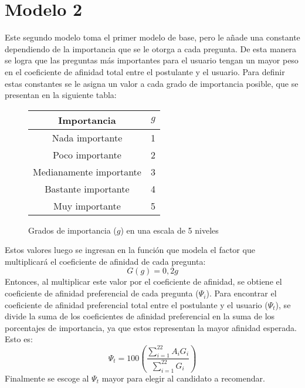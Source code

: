 \documentclass[a4paper]{article}
\begin{document}
\section{Modelo 2}
Este segundo modelo toma el primer modelo de base, pero le añade una constante dependiendo de la importancia que se le otorga a cada pregunta. De esta manera se logra que las preguntas más importantes para el usuario tengan un mayor peso en el coeficiente de afinidad total entre el postulante y el usuario. Para definir estas constantes se le asigna un valor a cada grado de importancia posible, que se presentan en la siguiente tabla: \newline 

\begin{figure}[H]
    \begin{center}
    \begin{tabular}{|c|c|}
    \hline
    Importancia &  $g$\\
    \hline
    Nada importante &  1\\
    \hline
    Poco importante & 2\\
    \hline
    Medianamente importante & 3\\
    \hline
    Bastante importante & 4\\
    \hline
    Muy importante & 5 \\
    \hline
\end{tabular}
\end{center}   
    \caption{ Grados de importancia ($g$) en una escala de 5 niveles}
\end{figure} 

\newline
Estos valores luego se ingresan en la función que modela el factor que multiplicará el coeficiente de afinidad de cada pregunta:
\begin{equation*}
    G(g) = 0,2g
\end{equation*}
Entonces, al multiplicar este valor por el coeficiente de afinidad, se obtiene el coeficiente de afinidad preferencial de cada pregunta ($\Psi_{i}$). Para encontrar el coeficiente de afinidad preferencial total entre el postulante y el usuario ($\Psi_{t}$), se divide la suma de los coeficientes de afinidad preferencial en la suma de los porcentajes de importancia, ya que estos representan la mayor afinidad esperada. Esto es:
\begin{equation*}
    \Psi_{t}= 100\left(\dfrac{\sum_{i=1}^{22}A_{i}G_{i}}{\sum_{i=1}^{22}G_{i}}\right)
\end{equation*}
Finalmente se escoge al $\Psi_{t}$ mayor para elegir al candidato a recomendar. 
\end{document}
